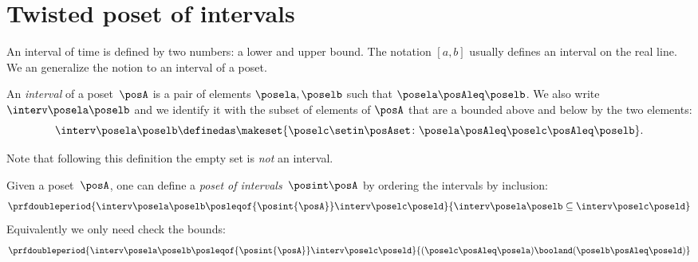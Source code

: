 
\section{Twisted poset of intervals}

An interval of time is defined by two numbers: a lower and upper bound.
The notation $[a,b]$ usually defines an interval on the real line.
We an generalize the notion to an interval of a poset.


\begin{definition}[Interval]
    \label{def:interval}
    An \emph{interval} of a poset~$\posA$ is a pair of elements $\posela, \poselb$ such that
    $\posela \posAleq \poselb$.
    We also write $\interv \posela \poselb$ and we identify
    it with the subset of elements of $\posA$ that are a bounded above and below by the two elements:
    \begin{equation*}
        \interv \posela \poselb
        \definedas
        \makeset{
            \poselc \setin \posAset \colon
            \posela \posAleq \poselc \posAleq \poselb
        }.
    \end{equation*}
\end{definition}

Note that following this definition the empty set is \emph{not} an interval.

\begin{definition}
    \label{def:poset_intervals}
    Given a poset~$\posA$, one can define a \emph{poset of intervals}~$\posint\posA$
    by ordering the intervals by inclusion:
    \begin{equation*}
        \prfdoubleperiod{
            \interv \posela \poselb
            \posleqof{\posint{\posA}}
            \interv \poselc \poseld
        }{
            \interv \posela \poselb
            \subseteq
            \interv \poselc \poseld
        }
    \end{equation*}
    Equivalently we only need check the bounds:
    \begin{equation*}
        \prfdoubleperiod{
            \interv \posela \poselb
            \posleqof{\posint{\posA}}
            \interv \poselc \poseld
        }{
            (\poselc \posAleq \posela ) \booland (\poselb \posAleq \poseld)
        }
    \end{equation*}

\end{definition}

